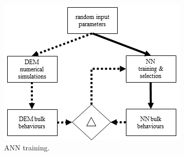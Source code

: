 \begin{figure}[!htb]
\centering
\includegraphics[width=.50\columnwidth]{images/127anntraining}
\caption[ANN training]{ANN training.}
\label{fig:127anntraining}
\end{figure}